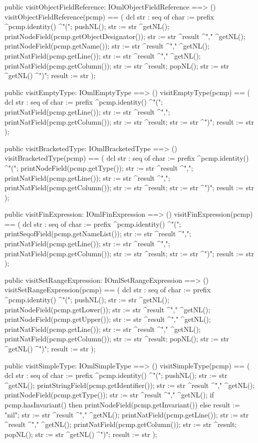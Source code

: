 \begin{vdm_al}
  public visitObjectFieldReference: IOmlObjectFieldReference ==> ()
  visitObjectFieldReference(pcmp) ==
    ( dcl str : seq of char := prefix ^pcmp.identity() ^"(";
      pushNL();
      str := str ^getNL();
      printNodeField(pcmp.getObjectDesignator());
      str := str ^result ^"," ^getNL();
      printNodeField(pcmp.getName());
      str := str ^result ^"," ^getNL();
      printNatField(pcmp.getLine());
      str := str ^result ^"," ^getNL();
      printNatField(pcmp.getColumn());
      str := str ^result;
      popNL();
      str := str ^getNL() ^")";
      result := str );

  public visitEmptyType: IOmlEmptyType ==> ()
  visitEmptyType(pcmp) ==
    ( dcl str : seq of char := prefix ^pcmp.identity() ^"(";
      printNatField(pcmp.getLine());
      str := str ^result ^",";
      printNatField(pcmp.getColumn());
      str := str ^result;
      str := str ^")";
      result := str );

  public visitBracketedType: IOmlBracketedType ==> ()
  visitBracketedType(pcmp) ==
    ( dcl str : seq of char := prefix ^pcmp.identity() ^"(";
      printNodeField(pcmp.getType());
      str := str ^result ^",";
      printNatField(pcmp.getLine());
      str := str ^result ^",";
      printNatField(pcmp.getColumn());
      str := str ^result;
      str := str ^")";
      result := str );

  public visitFinExpression: IOmlFinExpression ==> ()
  visitFinExpression(pcmp) ==
    ( dcl str : seq of char := prefix ^pcmp.identity() ^"(";
      printSeqofField(pcmp.getNameList());
      str := str ^result ^",";
      printNatField(pcmp.getLine());
      str := str ^result ^",";
      printNatField(pcmp.getColumn());
      str := str ^result;
      str := str ^")";
      result := str );

  public visitSetRangeExpression: IOmlSetRangeExpression ==> ()
  visitSetRangeExpression(pcmp) ==
    ( dcl str : seq of char := prefix ^pcmp.identity() ^"(";
      pushNL();
      str := str ^getNL();
      printNodeField(pcmp.getLower());
      str := str ^result ^"," ^getNL();
      printNodeField(pcmp.getUpper());
      str := str ^result ^"," ^getNL();
      printNatField(pcmp.getLine());
      str := str ^result ^"," ^getNL();
      printNatField(pcmp.getColumn());
      str := str ^result;
      popNL();
      str := str ^getNL() ^")";
      result := str );

  public visitSimpleType: IOmlSimpleType ==> ()
  visitSimpleType(pcmp) ==
    ( dcl str : seq of char := prefix ^pcmp.identity() ^"(";
      pushNL();
      str := str ^getNL();
      printStringField(pcmp.getIdentifier());
      str := str ^result ^"," ^getNL();
      printNodeField(pcmp.getType());
      str := str ^result ^"," ^getNL();
      if pcmp.hasInvariant()
      then printNodeField(pcmp.getInvariant())
      else result := "nil";
      str := str ^result ^"," ^getNL();
      printNatField(pcmp.getLine());
      str := str ^result ^"," ^getNL();
      printNatField(pcmp.getColumn());
      str := str ^result;
      popNL();
      str := str ^getNL() ^")";
      result := str );


\end{vdm_al}
